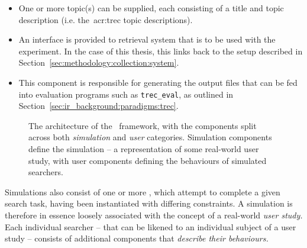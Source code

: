 \begin{itemize}
    \item{ One or more topic(s) can be supplied, each consisting of a title and topic description (i.e. the~\gls{acr:trec} topic descriptions).}
    \item{ An interface is provided to retrieval system that is to be used with the experiment. In the case of this thesis, this links back to the setup described in Section~\ref{sec:methodology:collection:system}.}
    \item{ This component is responsible for generating the output files that can be fed into evaluation programs such as \texttt{trec\_eval}, as outlined in Section~\ref{sec:ir_background:paradigms:trec}.}
\end{itemize}

\begin{figure}[t!]
    \centering
    \caption[SimIIR architecture]{The architecture of the \simiir~framework, with the components split across both \emph{simulation} and \emph{user} categories. Simulation components define the simulation – a representation of some real-world user study, with user components defining the behaviours of simulated searchers.}
    \label{fig:simiir}
\end{figure}

Simulations also consist of one or more , which attempt to complete a given search task, having been instantiated with differing constraints. A simulation is therefore in essence loosely associated with the concept of a real-world \emph{user study.} Each individual searcher -- that can be likened to an individual subject of a user study -- consists of additional components that \emph{describe their behaviours.}

